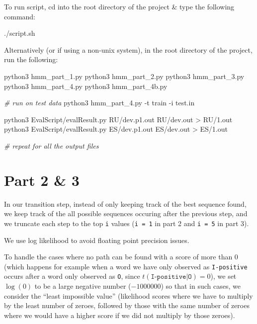 \documentclass[
]{article}
\author{}
\date{}
\newenvironment{Shaded}{}{}
\newcommand{\AttributeTok}[1]{\textcolor[rgb]{0.49,0.56,0.16}{#1}}
\newcommand{\CommentTok}[1]{\textcolor[rgb]{0.38,0.63,0.69}{\textit{#1}}}
\newcommand{\ExtensionTok}[1]{#1}
\newcommand{\NormalTok}[1]{#1}
\newcommand{\OperatorTok}[1]{\textcolor[rgb]{0.40,0.40,0.40}{#1}}
\begin{document}
To run script, cd into the root directory of the project \& type the
following command:

\begin{Shaded}
\begin{Highlighting}[]
\ExtensionTok{./script.sh}
\end{Highlighting}
\end{Shaded}

Alternatively (or if using a non-unix system), in the root directory of
the project, run the following:

\begin{Shaded}
\begin{Highlighting}[]
\ExtensionTok{python3}\NormalTok{ hmm\_part\_1.py}
\ExtensionTok{python3}\NormalTok{ hmm\_part\_2.py}
\ExtensionTok{python3}\NormalTok{ hmm\_part\_3.py}
\ExtensionTok{python3}\NormalTok{ hmm\_part\_4.py}
\ExtensionTok{python3}\NormalTok{ hmm\_part\_4b.py}

\CommentTok{\# run on test data}
\ExtensionTok{python3}\NormalTok{ hmm\_part\_4.py }\AttributeTok{{-}t}\NormalTok{ train }\AttributeTok{{-}i}\NormalTok{ test.in}

\ExtensionTok{python3}\NormalTok{ EvalScript/evalResult.py RU/dev.p1.out RU/dev.out }\OperatorTok{\textgreater{}}\NormalTok{ RU/1.out}
\ExtensionTok{python3}\NormalTok{ EvalScript/evalResult.py ES/dev.p1.out ES/dev.out }\OperatorTok{\textgreater{}}\NormalTok{ ES/1.out}

\CommentTok{\# repeat for all the output files}
\end{Highlighting}
\end{Shaded}

\hypertarget{part-2-3}{%
\section{Part 2 \& 3}\label{part-2-3}}

In our transition step, instead of only keeping track of the best
sequence found, we keep track of the all possible sequences occuring
after the previous step, and we truncate each step to the top \texttt{i}
values (\texttt{i\ =\ 1} in part 2 and \texttt{i\ =\ 5} in part 3).

We use log likelihood to avoid floating point precision issues.

To handle the cases where no path can be found with a score of more than
0 (which happens for example when a word we have only observed as
\texttt{I-positive} occurs after a word only observed as \texttt{O},
since $t(\texttt{I-positive} | \texttt{O}) = 0$), we set $\log(0)$
to be a large negative number ($-1000000$) so that in such cases,
we consider the ``least impossible value'' (likelihood scores where we
have to multiply by the least number of zeroes, followed by those with
the same number of zeroes where we would have a higher score if we did
not multiply by those zeroes).
\end{document}
